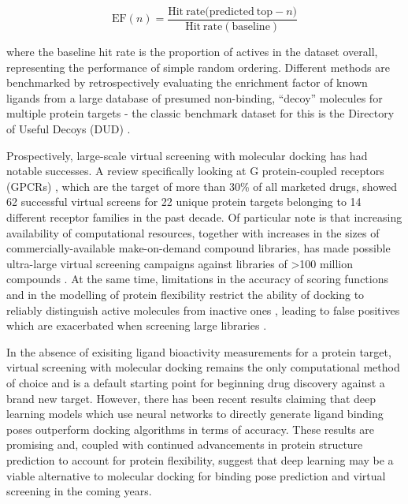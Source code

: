 \begin{equation}
    \mathrm{EF}(n) = \frac{\mathrm{Hit\: rate (predicted\: top - }n)}{\mathrm{Hit\: rate (baseline)}}
\end{equation}

where the baseline hit rate is the proportion of actives in the dataset overall, representing the performance of simple random ordering. Different methods are benchmarked by retrospectively evaluating the enrichment factor of known ligands from a large database of presumed non-binding, “decoy” molecules for multiple protein targets - the classic benchmark dataset for this is the Directory of Useful Decoys (DUD) \cite{Huang2006DUD, Mysinger2012DUDE}.

Prospectively, large-scale virtual screening with molecular docking has had notable successes. A review specifically looking at G protein-coupled receptors (GPCRs) \cite{Ballante2021DockingGPCR}, which are the target of more than 30\% of all marketed drugs, showed 62 successful virtual screens for 22 unique protein targets belonging to 14 different receptor families in the past decade. Of particular note is that increasing availability of computational resources, together with increases in the sizes of commercially-available make-on-demand compound libraries, has made possible ultra-large virtual screening campaigns against libraries of >100 million compounds  \cite{Lyu2019UltraLargeDocking, Alon2021sigma, Fink2022Alpha}. At the same time, limitations in the accuracy of scoring functions and in the modelling of protein flexibility \cite{Erickson2004flexibility, Antunes2015flexibility} restrict the ability of docking to reliably distinguish active molecules from inactive ones \cite{Llanos2021StrengthsAndWeaknesses, Macip2022HasteMakesWaste}, leading to false positives which are exacerbated when screening large libraries \cite{Lyu2023Expansion}.

In the absence of exisiting ligand bioactivity measurements for a protein target, virtual screening with molecular docking remains the only computational method of choice and is a default starting point for beginning drug discovery against a brand new target. However, there has been recent results claiming that deep learning models which use neural networks to directly generate ligand binding poses \cite{Stark2022equibind, corso2023diffdock} outperform docking algorithms in terms of accuracy. These results are promising and, coupled with continued advancements in protein structure prediction to account for protein flexibility, suggest that deep learning may be a viable alternative to molecular docking for binding pose prediction and virtual screening in the coming years.

